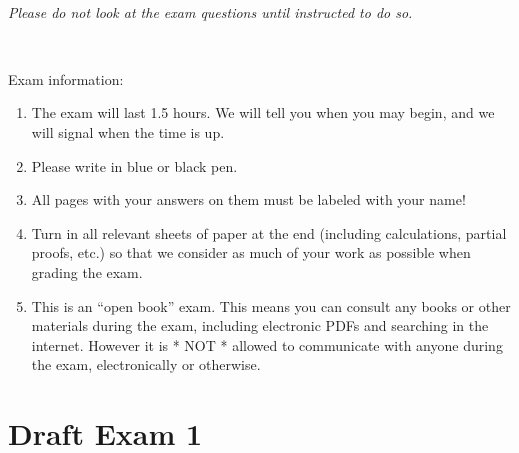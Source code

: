 \documentclass[paper=8.125in:10.250in,pagesize=pdftex,
    headinclude=false,footinclude=false,oneside,egregdoesnotlikesansseriftitles]{kaobook}
\begin{document}
\

\emph{Please do not look at the exam questions until instructed to do so.}

\

Exam information: 
\begin{enumerate}
\item The exam will last 1.5 hours. We will tell you when you may begin, and we will signal when the time is up. 
\item Please write in blue or black pen. 
\item All pages with your answers on them must be labeled with your name!
\item Turn in all relevant sheets of paper at the end (including calculations, partial proofs, etc.) so that we consider as much of your work as possible when grading the exam. 
\item This is an ``open book'' exam. This means you can consult any books or other materials during the exam, including electronic PDFs and searching in the internet. However it is * NOT * allowed to communicate with anyone during the exam, electronically or otherwise. 
\end{enumerate}

\newpage

\section*{Draft Exam 1}
\end{document}
